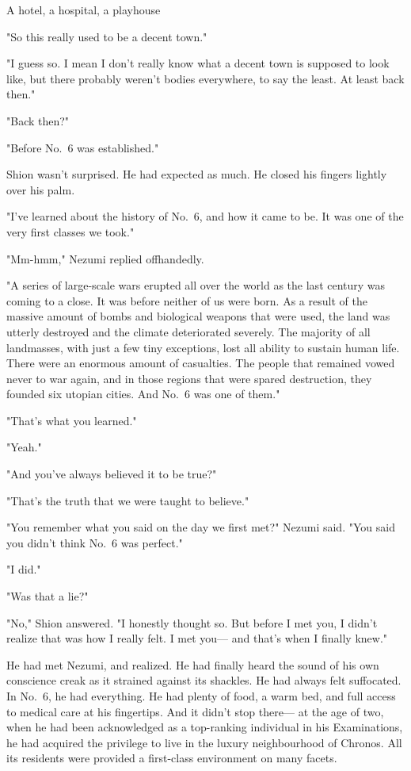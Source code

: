 A hotel, a hospital, a playhouse\el 

"So this really used to be a decent town."

"I guess so. I mean I don't really know what a decent town is supposed
to look like, but there probably weren't bodies everywhere, to say the
least. At least back then."

"Back then?"

"Before No.~6 was established."

Shion wasn't surprised. He had expected as much. He closed his fingers
lightly over his palm.

"I've learned about the history of No.~6, and how it came to be. It was
one of the very first classes we took."

"Mm-hmm," Nezumi replied offhandedly.

"A series of large-scale wars erupted all over the world as the last
century was coming to a close. It was before neither of us were born. As
a result of the massive amount of bombs and biological weapons that were
used, the land was utterly destroyed and the climate deteriorated
severely. The majority of all landmasses, with just a few tiny
exceptions, lost all ability to sustain human life. There were an
enormous amount of casualties. The people that remained vowed never to
war again, and in those regions that were spared destruction, they
founded six utopian cities. And No.~6 was one of them."

"That's what you learned."

"Yeah."

"And you've always believed it to be true?"

"That's the truth that we were taught to believe."

"You remember what you said on the day we first met?" Nezumi said. "You
said you didn't think No.~6 was perfect."

"I did."

"Was that a lie?"

"No," Shion answered. "I honestly thought so. But before I met you, I
didn't realize that was how I really felt. I met you--- and that's when I
finally knew."

He had met Nezumi, and realized. He had finally heard the sound of his
own conscience creak as it strained against its shackles. He had always
felt suffocated. In No.~6, he had everything. He had plenty of food, a
warm bed, and full access to medical care at his fingertips. And it
didn't stop there--- at the age of two, when he had been acknowledged as a
top-ranking individual in his Examinations, he had acquired the
privilege to live in the luxury neighbourhood of Chronos. All its
residents were provided a first-class environment on many facets.

